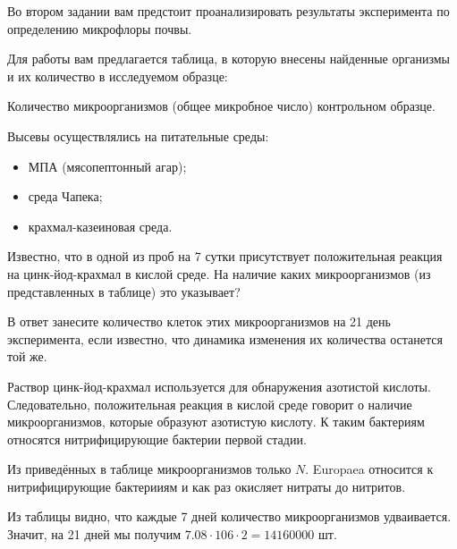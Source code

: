 
Во втором задании вам предстоит проанализировать результаты эксперимента по определению микрофлоры почвы.

Для работы вам предлагается таблица, в которую внесены найденные организмы и их количество в исследуемом образце:

\begin{center}
Количество микроорганизмов (общее микробное число) контрольном образце.
\end{center}


Высевы осуществлялись на питательные среды:

\begin{itemize}
    \item МПА (мясопептонный агар);
    \item среда Чапека;
    \item крахмал-казеиновая среда.
\end{itemize}

Известно, что в одной из проб на 7 сутки присутствует положительная реакция на цинк-йод-крахмал в кислой среде. На наличие каких микроорганизмов (из представленных в таблице) это указывает?

В ответ занесите количество клеток этих микроорганизмов на 21 день эксперимента, если известно, что динамика изменения их количества останется той же.

\solutionSection

Раствор цинк-йод-крахмал используется для обнаружения азотистой кислоты. Следовательно, положительная реакция в кислой среде говорит о наличие микроорганизмов, которые образуют азотистую кислоту. К таким бактериям относятся нитрифицирующие бактерии первой стадии. 

Из приведённых в таблице микроорганизмов только $N$. Europaea относится к нитрифицирующие бактерииям и как раз окисляет нитраты до нитритов. 

Из таблицы видно, что каждые 7 дней количество микроорганизмов удваивается. 
Значит, на 21 дней мы получим $7.08 \cdot10 6  \cdot 2 = 14160000$ шт.

